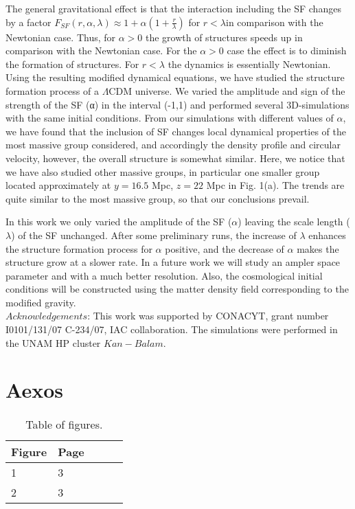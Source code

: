 \documentclass[10pt,times]{IEEEtran}
\begin{document}
The general gravitational effect is that the interaction including the SF changes by a factor \(F_{SF}(r,\alpha,\lambda)\approx 1+ \alpha(1+\frac{r}{\lambda})\) for \(r<\lambda\)in comparison with the Newtonian case. Thus, for \(\alpha>0\) the growth of structures speeds up
in comparison with the Newtonian case. For the \(\alpha>0\) case the effect is to diminish the formation of structures.
For \(r<\lambda\) the dynamics is essentially Newtonian.\\

Using the resulting modified dynamical equations, we have studied the structure formation process of a \(\Lambda\)CDM universe. We varied the amplitude and sign of the strength of the SF (α) in the interval (-1,1) and performed several 3D-simulations with the same initial conditions. From our simulations with different values of \(\alpha\), we have found that the inclusion of SF changes local dynamical properties of the most massive group considered, and accordingly the density profile and circular velocity, however, the overall structure is somewhat similar. Here, we notice that we have also studied other massive groups, in particular one smaller group located approximately at
$y = 16.5$ Mpc, $z = 22$ Mpc in Fig. 1(a). The trends are quite similar to the most massive group, so that our conclusions prevail.\\ 
\vspace{20cm}

In this work we only varied the amplitude of the SF (\(\alpha\)) leaving the scale length (\(\lambda\)) of the SF unchanged. After some preliminary runs, the increase of \(\lambda\) enhances the structure formation process for \(\alpha\) positive, and the decrease of \(\alpha\) makes the structure grow at a slower rate. In a future work we will study an ampler space parameter and with a much better resolution. Also, the cosmological initial conditions will be constructed using the matter density field corresponding to the modified gravity.\\

$Acknowledgements$: This work was supported by
CONACYT, grant number I0101/131/07 C-234/07, IAC
collaboration. The simulations were performed in the
UNAM HP cluster $Kan-Balam$.





\section{\textbf{Aexos}}

\begin{table}[htb!]\centering
\begin{tabular}{|l|l|l|l|l|}
\hline
Figure & Page \\ \hline
1 & 3 \\ \hline
2 & 3 \\ \hline
\end{tabular}
\caption{Table of figures.}
\label{table:V1}
\end{table}

\hline


\end{document}
